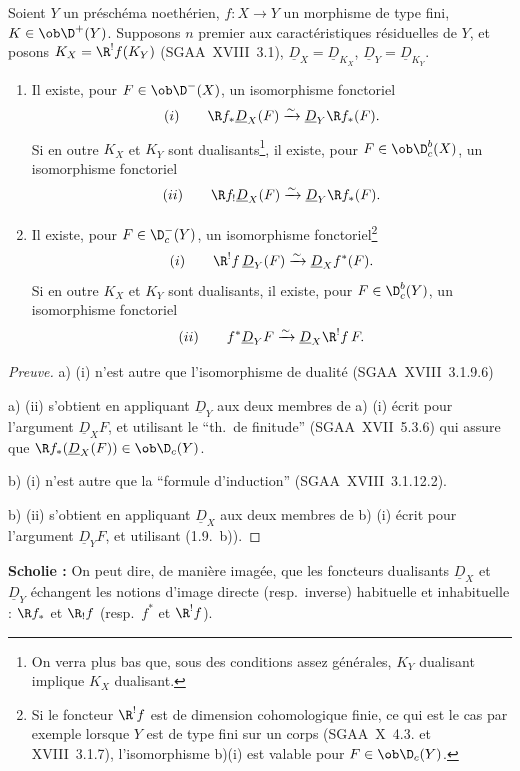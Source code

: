 \begin{proposition}
Soient $Y$ un préschéma noethérien, $f : X \to Y$ un morphisme de type fini, $K \in \ob \D^{+}(Y)$. Supposons $n$ premier aux caractéristiques résiduelles de $Y$, et posons $K_X = \R^{!}f(K_Y)$ (SGAA~XVIII~3.1), $\underline{D}_X = \underline{D}_{K_X}$, $\underline{D}_Y = \underline{D}_{K_Y}$.
\begin{enumerate}
\item[a)] Il existe, pour $F \in \ob \D^{-}(X)$, un isomorphisme fonctoriel
\[
(i) \qquad \R f_{*} \underline{D}_X(F) \xrightarrow{\sim} \underline{D}_Y \R f_{*}(F).
\]
Si en outre $K_X$ et $K_Y$ sont dualisants\footnote{On verra plus bas que, sous des conditions assez générales, $K_Y$ dualisant implique $K_X$ dualisant.}, il existe, pour $F \in \ob \D_c^{b}(X)$, un isomorphisme fonctoriel
\[
(ii) \qquad \R f_{!} \underline{D}_X(F) \xrightarrow{\sim} \underline{D}_Y \R f_{*}(F).
\]
\item[b)] Il existe, pour $F \in \D_c^{-}(Y)$, un isomorphisme fonctoriel\footnote{Si le foncteur $\R^{!}f$ est de dimension cohomologique finie, ce qui est le cas par exemple lorsque $Y$ est de type fini sur un corps (SGAA~X~4.3. et XVIII~3.1.7), l'isomorphisme b)(i) est valable pour $F \in \ob \D_c(Y)$.}
\[
(i) \qquad \R^{!}f \, \underline{D}_Y(F) \xrightarrow{\sim} \underline{D}_X f^{*}(F).
\]
Si en outre $K_X$ et $K_Y$ sont dualisants\footnotemark[3], il existe, pour $F \in \D_c^{b}(Y)$, un isomorphisme fonctoriel
\[
(ii) \qquad f^{*} \underline{D}_Y F \xrightarrow{\sim} \underline{D}_X \R^{!}f \, F.
\]
\end{enumerate}
\end{proposition}

\begin{proof}[Preuve]
a) (i) n'est autre que l'isomorphisme de dualité (SGAA~XVIII~3.1.9.6)

a) (ii) s'obtient en appliquant $\underline{D}_Y$ aux deux membres de a) (i) écrit pour l'argument $\underline{D}_X F$, et utilisant le ``th.~de finitude'' (SGAA~XVII~5.3.6) qui assure que $\R f_{*}(\underline{D}_X(F)) \in \ob \D_c(Y)$.

b) (i) n'est autre que la ``formule d'induction'' (SGAA~XVIII~3.1.12.2).

b) (ii) s'obtient en appliquant $\underline{D}_X$ aux deux membres de b) (i) écrit pour l'argument $\underline{D}_Y F$, et utilisant (1.9.~b)).
\end{proof}

\textbf{Scholie :} On peut dire, de manière imagée, que les foncteurs dualisants $\underline{D}_X$ et $\underline{D}_Y$ échangent les notions d'image directe (resp.~inverse) habituelle et inhabituelle : $\R f_{*}$ et $\R_{!}f$ (resp.~$f^{*}$ et $\R^{!}f$).

